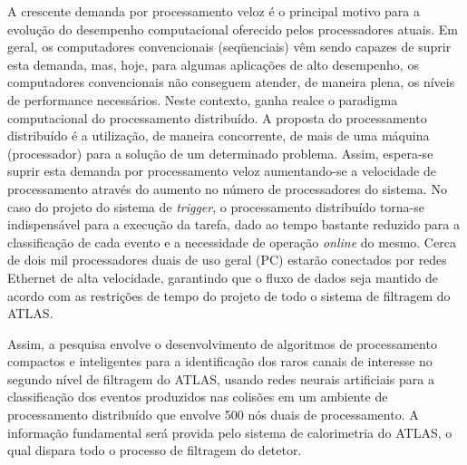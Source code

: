 A crescente demanda por processamento veloz é o principal motivo para a evolução do desempenho computacional oferecido pelos processadores atuais. Em geral, os computadores convencionais (seqüenciais) vêm sendo capazes de suprir esta demanda, mas, hoje, para algumas aplicações de alto desempenho, os computadores convencionais não conseguem atender, de maneira plena, os níveis de performance necessários. Neste contexto, ganha realce o paradigma computacional do processamento distribuído. A proposta do processamento distribuído é a utilização, de maneira concorrente, de mais de uma máquina (processador) para a solução de um determinado problema. Assim, espera-se suprir esta demanda por processamento veloz aumentando-se a velocidade de processamento através do aumento no número de processadores do sistema. No caso do projeto do sistema de \emph{trigger}, o processamento distribuído torna-se indispensável para a execução da tarefa, dado ao tempo bastante reduzido para a classificação de cada evento e a necessidade de operação \emph{online} do mesmo. Cerca de dois mil processadores duais de uso geral (PC) estarão conectados por redes Ethernet de alta velocidade, garantindo que o fluxo de dados seja mantido de acordo com as restrições de tempo do projeto de todo o sistema de filtragem do ATLAS.

Assim, a pesquisa envolve o desenvolvimento de algoritmos de processamento compactos e inteligentes para a identificação dos raros canais de interesse no segundo nível de filtragem do ATLAS, usando redes neurais artificiais para a classificação dos eventos produzidos nas colisões em um ambiente de processamento distribuído que envolve 500 nós duais de processamento. A informação fundamental será provida pelo sistema de calorimetria do ATLAS, o qual dispara todo o processo de filtragem do detetor.

